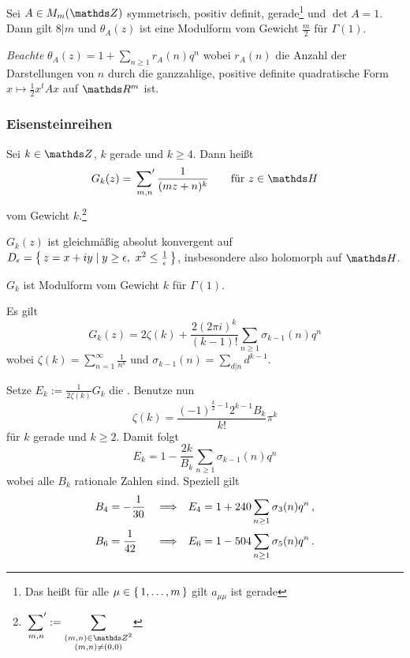 \begin{satz}
	Sei $A \in M_m(\ZZ)$ symmetrisch, positiv definit, gerade\footnote{Das heißt für alle $\mu \in \left\{\,1, \ldots, m\,\right\}$ gilt $a_{\mu\mu}$ ist gerade} und $\det A = 1$.
	Dann gilt $8|m$ und $\theta_A(z)$ ist eine Modulform vom Gewicht $\frac{m}{2}$ für $\Gamma(1)$.
	
	\emph{Beachte} $\theta_A(z) = 1 + \sum_{n \geq 1} r_A(n) q^n$ wobei $r_A(n)$ die Anzahl der Darstellungen von $n$ durch die ganzzahlige, positive definite quadratische Form $x \mapsto \frac{1}{2} x^t A x$ auf $\RR^m$ ist.
\end{satz}

\subsubsection{Eisensteinreihen}

\begin{defi}
	Sei $k \in \ZZ$, $k$ gerade und $k \geq 4$.
	Dann heißt
	\[
		G_k(z) = \sumprime_{m,n} \frac{1}{(mz+n)^k}
		\qquad \text{für }
		z \in \HH
	\]
	 vom Gewicht $k$.\footnote{$\displaystyle \sumprime_{m,n} := \sum_{\substack{(m,n) \in \ZZ^2 \\ (m,n) \not= (0,0)}}$}
\end{defi}

\begin{satz-list}
	\item $G_k(z)$ ist gleichmäßig absolut konvergent auf $D_\epsilon = \Set{ z=x+iy \mid y \geq \epsilon,\ x^2 \leq \frac{1}{\epsilon}}$, insbesondere also holomorph auf $\HH$.
	\item $G_k$ ist Modulform vom Gewicht $k$ für $\Gamma(1)$.
	\item Es gilt
	\[
		G_k(z) = 2\zeta(k) + \frac{2(2\pi i)^k}{(k-1)!} \sum_{n \geq 1} \sigma_{k-1}(n)q^n
	\]
	wobei $\zeta(k) = \sum_{n=1}^\infty \frac{1}{n^k}$ und $\sigma_{k-1}(n) = \sum_{d|n} d^{k-1}$.
	
	Setze $E_k := \frac{1}{2\zeta(k)} G_k$ die .
	Benutze nun
	\[
		\zeta(k) = \frac{(-1)^{\frac{k}{2}-1}2^{k-1} B_k}{k!} \pi^k
	\]
	für $k$ gerade und $k \geq 2$.
	Damit folgt
	\[
		E_k = 1 - \frac{2k}{B_k} \sum_{n \geq 1} \sigma_{k-1}(n)q^n
	\]
	wobei alle $B_k$ rationale Zahlen sind. Speziell gilt 
	\begin{align*}
		B_4 &= -\frac 1{30} &&\Longrightarrow& E_4 &= 1 + 240 \sum_{n \geq 1} \sigma_3 (n) q^n
		\,, \\
		B_6 &= \frac 1{42} &&\Longrightarrow& E_6 &= 1 - 504 \sum_{n \geq 1} \sigma_5 (n) q^n
		\,.
	\end{align*}
\end{satz-list}

